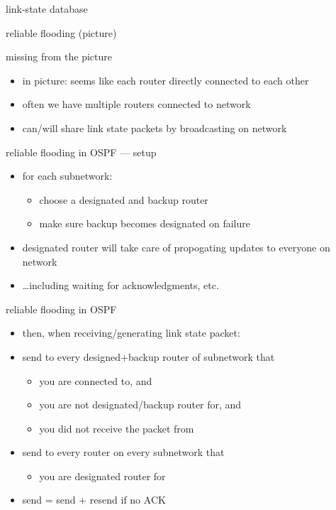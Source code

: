 
\begin{frame}{link-state database}
\end{frame}

\begin{frame}{reliable flooding (picture)}
\end{frame}

\begin{frame}{missing from the picture}
    \begin{itemize}
    \item in picture: seems like each router directly connected to each other
    \item often we have multiple routers connected to network
    \item can/will share link state packets by broadcasting on network
    \end{itemize}
\end{frame}

\begin{frame}{reliable flooding in OSPF --- setup}
    \begin{itemize}
    \item for each subnetwork:
        \begin{itemize}
        \item choose a designated and backup router
        \item make sure backup becomes designated on failure
        \end{itemize}
    \item designated router will take care of propogating updates to everyone on network
    \item \ldots including waiting for acknowledgments, etc.
    \end{itemize}
\end{frame}

\begin{frame}{reliable flooding in OSPF}
    \begin{itemize}
    \item then, when receiving/generating link state packet:
    \item send to every designed+backup router of subnetwork that
        \begin{itemize}
        \item you are connected to, and
        \item you are not designated/backup router for, and
        \item you did not receive the packet from
        \end{itemize}
    \item send to every router on every subnetwork that
        \begin{itemize}
        \item you are designated router for
        \end{itemize}
    \item send = send + resend if no ACK
    \end{itemize}
\end{frame}

